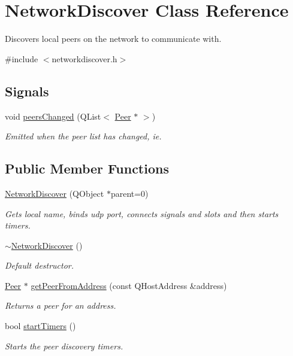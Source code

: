 \hypertarget{class_network_discover}{
\section{\-Network\-Discover \-Class \-Reference}
\label{class_network_discover}
}


\-Discovers local peers on the network to communicate with.  




{\ttfamily \#include $<$networkdiscover.\-h$>$}

\subsection*{\-Signals}
\begin{DoxyCompactItemize}
\item 
void \hyperlink{class_network_discover_a42566247e43198ea9cce91eb5f15511d}{peers\-Changed} (\-Q\-List$<$ \hyperlink{class_peer}{\-Peer} $\ast$ $>$)
\begin{DoxyCompactList}\small\item\em \-Emitted when the peer list has changed, ie. \end{DoxyCompactList}\end{DoxyCompactItemize}
\subsection*{\-Public \-Member \-Functions}
\begin{DoxyCompactItemize}
\item 
\hyperlink{class_network_discover_a35d97308463f9cbe622767b2d364bdbb}{\-Network\-Discover} (\-Q\-Object $\ast$parent=0)
\begin{DoxyCompactList}\small\item\em \-Gets local name, binds udp port, connects signals and slots and then starts timers. \end{DoxyCompactList}\item 
\hyperlink{class_network_discover_a416e23eb1f6925197596731e3c5f325e}{$\sim$\-Network\-Discover} ()
\begin{DoxyCompactList}\small\item\em \-Default destructor. \end{DoxyCompactList}\item 
\hyperlink{class_peer}{\-Peer} $\ast$ \hyperlink{class_network_discover_a91ec8539ddfeb90f6735d05f2f10b97a}{get\-Peer\-From\-Address} (const \-Q\-Host\-Address \&address)
\begin{DoxyCompactList}\small\item\em \-Returns a peer for an address. \end{DoxyCompactList}\item 
bool \hyperlink{class_network_discover_ac25855eb9d181d51c725a57f693d58f8}{start\-Timers} ()
\begin{DoxyCompactList}\small\item\em \-Starts the peer discovery timers. \end{DoxyCompactList}\end{DoxyCompactItemize}
